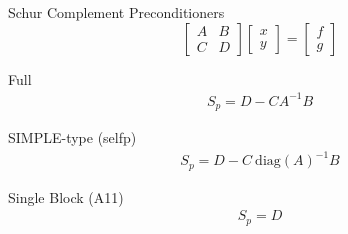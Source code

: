 \begin{frame}[shrink]{Schur Complement Preconditioners}
  \begin{equation*}
    \begin{bmatrix}
      A & B \\ C & D
    \end{bmatrix}
    \begin{bmatrix}
      x \\ y
    \end{bmatrix}
    =
    \begin{bmatrix}
      f \\ g
    \end{bmatrix}
  \end{equation*}
  \begin{block}{Full}
    \begin{align*}
      S_p = D - C A^{-1} B
    \end{align*}
  \end{block}
\begin{block}{SIMPLE-type (selfp)}
  \begin{align*}
      S_p =  D - C\ \text{diag}\left(A\right)^{-1} B
    \end{align*}
  \end{block}
  \begin{block}{Single Block (A11)}
    \begin{align*}
      S_p = D 
    \end{align*}
  \end{block}
\end{frame}
